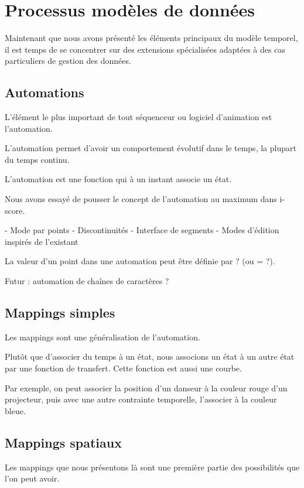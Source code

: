 \documentclass{sigchi}
\begin{document}
\section{Processus modèles de données}
Maintenant que nous avons présenté les éléments principaux du modèle temporel, il est temps de se concentrer sur des extensions spécialisées adaptées à des cas particuliers de gestion des données.

\subsection{Automations}
L'élément le plus important de tout séquenceur ou logiciel d'animation est l'automation.

L'automation permet d'avoir un comportement évolutif dans le temps, la plupart du temps continu.

L'automation est une fonction qui à un instant associe un état.

Nous avons essayé de pousser le concept de l'automation au maximum dans i-score.

- Mode par points
- Discontinuités
- Interface de segments
- Modes d'édition inspirés de l'existant

La valeur d'un point dans une automation peut être définie par ? (ou = ?).

Futur : automation de chaînes de caractères ?

\subsection{Mappings simples}
Les mappings sont une généralisation de l'automation.

Plutôt que d'associer du temps à un état, nous associons un état à un autre état par une fonction de transfert. Cette fonction est aussi une courbe.

Par exemple, on peut associer la position d'un danseur à la couleur rouge d'un projecteur, puis avec une autre contrainte temporelle, l'associer à la couleur bleue.


\subsection{Mappings spatiaux}

Les mappings que nous présentons là sont une première partie des possibilités que l'on peut avoir.
\end{document}
